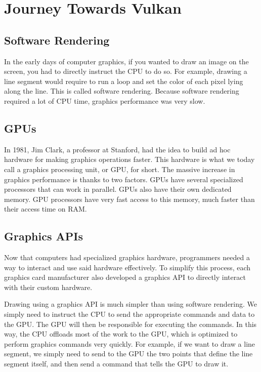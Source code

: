 \chapter{Journey Towards Vulkan}

\section{Software Rendering}

In the early days of computer graphics, if you wanted to draw an image on the
screen, you had to directly instruct the CPU to do so.
For example, drawing a line segment would require to run a loop and set the
color of each pixel lying along the line.
This is called software rendering.
Because software rendering required a lot of CPU time, graphics performance
was very slow.

\section{GPUs}

In 1981, Jim Clark, a professor at Stanford, had the idea to build
ad hoc hardware for making graphics operations faster.
This hardware is what we today call a graphics processing unit, or
GPU, for short.
The massive increase in graphics performance is thanks to two factors.
GPUs have several specialized processors that can work in parallel.
GPUs also have their own dedicated memory.
GPU processors have very fast access to this memory, much faster than
their access time on RAM.

\section{Graphics APIs}

Now that computers had specialized graphics hardware, programmers
needed a way to interact and use said hardware effectively.
To simplify this process, each graphics card manufacturer also developed
a graphics API to directly interact with their custom hardware.

Drawing using a graphics API is much simpler than using software rendering.
We simply need to instruct the CPU to send the appropriate commands and data
to the GPU.
The GPU will then be responsible for executing the commands.
In this way, the CPU offloads most of the work to the GPU, which is optimized
to perform graphics commands very quickly.
For example, if we want to draw a line segment, we simply need to send to the
GPU the two points that define the line segment itself, and then send a
command that tells the GPU to draw it.


